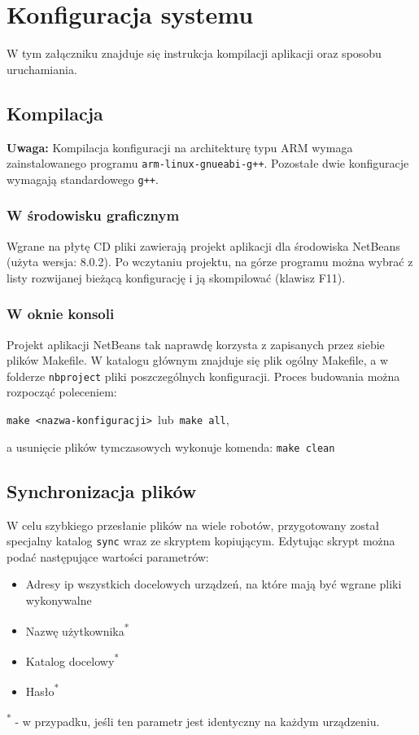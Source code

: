 \section{Konfiguracja systemu}
\label{ch:konfiguracja_systemu}

W tym załączniku znajduje się instrukcja kompilacji aplikacji oraz sposobu uruchamiania.

\subsection{Kompilacja}

\textbf{Uwaga:} Kompilacja konfiguracji na architekturę typu ARM wymaga zainstalowanego programu {\tt arm-linux-gnueabi-g++}. Pozostałe dwie konfiguracje wymagają standardowego {\tt g++}.

\subsubsection{W środowisku graficznym}

Wgrane na płytę CD pliki zawierają projekt aplikacji dla środowiska NetBeans (użyta wersja: 8.0.2). Po wczytaniu projektu, na górze programu można wybrać z\,listy rozwijanej bieżącą konfigurację i ją skompilować (klawisz F11).

\subsubsection{W oknie konsoli}

Projekt aplikacji NetBeans tak naprawdę korzysta z zapisanych przez siebie plików Makefile. W katalogu głównym znajduje się plik ogólny Makefile, a w folderze {\tt nbproject} pliki poszczególnych konfiguracji. Proces budowania można rozpocząć poleceniem:
\begin{center}
    {\tt make <nazwa-konfiguracji>}\  lub\
    {\tt make all},
\end{center}
a usunięcie plików tymczasowych wykonuje komenda: {\tt make clean}

\subsection{Synchronizacja plików}

W celu szybkiego przesłanie plików na wiele robotów, przygotowany został specjalny katalog {\tt sync} wraz ze skryptem kopiującym. Edytując skrypt można podać następujące wartości parametrów:
\begin{itemize}
    \item Adresy ip wszystkich docelowych urządzeń, na które mają być wgrane pliki wykonywalne
    \item Nazwę użytkownika\textsuperscript{*}
    \item Katalog docelowy\textsuperscript{*}
    \item Hasło\textsuperscript{*}
\end{itemize}
\textsuperscript{*} - w przypadku, jeśli ten parametr jest identyczny na każdym urządzeniu.

